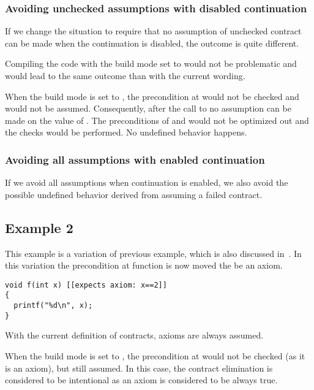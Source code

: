 \subsubsection{Avoiding unchecked assumptions with disabled continuation}

If we change the situation to require that no assumption of unchecked contract
can be made when the continuation is disabled, the outcome is quite different.

Compiling the code with the build mode set to  would not be
problematic and would lead to the same outcome than with the current wording.

When the build mode is set to , the precondition at
 would not be checked and would not be assumed. Consequently, after
the call to  no assumption can be made on the value of
. The preconditions of  and  would not be
optimized out and the checks would be performed. No undefined behavior happens.

\subsubsection{Avoiding all assumptions with enabled continuation}

If we avoid all assumptions when continuation is enabled, we also avoid the
possible undefined behavior derived from assuming a failed contract.

\subsection{Example 2}

This example is a variation of previous example, which is also discussed
in~\cite{p1321r0}. In this variation the precondition at function  is
now moved the be an axiom.

\begin{lstlisting}
void f(int x) [[expects axiom: x==2]]
{
  printf("%d\n", x);
}
\end{lstlisting}

With the current definition of contracts, axioms are always assumed.

When the build mode is set to , the precondition at
 would not be checked (as it is an axiom), but still assumed.
In this case, the contract elimination is considered to be intentional as
an axiom is considered to be always true.

